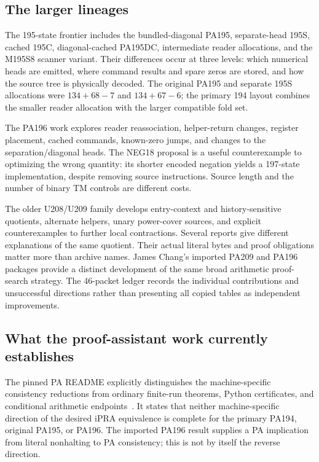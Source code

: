\documentclass[11pt,letterpaper]{article}
\begin{document}
\subsection{The larger lineages}

The 195-state frontier includes the bundled-diagonal PA195, separate-head
195S, cached 195C, diagonal-cached PA195DC, intermediate reader allocations,
and the M195S8 scanner variant. Their differences occur at three levels:
which numerical heads are emitted, where command results and spare zeros
are stored, and how the source tree is physically decoded. The original
PA195 and separate 195S allocations were $134+68-7$ and $134+67-6$;
the primary 194 layout combines the smaller reader allocation with the
larger compatible fold set.

The PA196 work explores reader reassociation, helper-return changes,
register placement, cached commands, known-zero jumps, and changes to the
separation/diagonal heads. The NEG18 proposal is a useful counterexample
to optimizing the wrong quantity: its shorter encoded negation yields a
197-state implementation, despite removing source instructions.
Source length and the number of binary TM controls are different costs.

The older U208/U209 family develops entry-context and history-sensitive
quotients, alternate helpers, unary power-cover sources, and explicit
counterexamples to further local contractions. Several reports give
different explanations of the same quotient. Their actual literal bytes
and proof obligations matter more than archive names. James Chang's
imported PA209 and PA196 packages provide a distinct development of the
same broad arithmetic proof-search strategy. The 46-packet ledger records
the individual contributions and unsuccessful directions rather than
presenting all copied tables as independent improvements.

\subsection{What the proof-assistant work currently establishes}

The pinned PA README explicitly distinguishes the machine-specific
consistency reductions from ordinary finite-run theorems, Python
certificates, and conditional arithmetic endpoints~\cite{pareadme}.
It states that neither machine-specific direction of the desired iPRA
equivalence is complete for the primary PA194, original PA195, or PA196.
The imported PA196 result supplies a PA implication from literal
nonhalting to PA consistency; this is not by itself the reverse direction.
\end{document}
